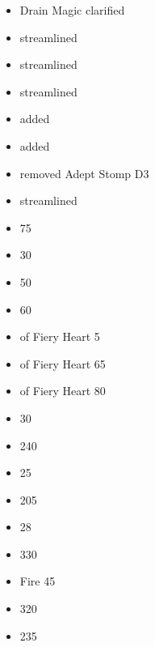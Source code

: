 
\subtitle{{2023 \betaname{} 2}}
\begin{itemize}
	\item Drain Magic clarified
	\item \martialdiscipline{} streamlined
	\item \fleetofficer{} streamlined
	\item \favourofmeladys{} streamlined
	\item \citizenarchers{} added \accurate{}
	\item \initiateofthefieryheart{} added \masterofspellcrafting{} \wordand{} \incendiaryalliance{} 
	\item \initiateofthefieryheart{} removed Adept \wordand{} Stomp D3
	\item \baleighighlanders{} streamlined
	\item \novaflare{} 75 
	\item \starmetalalloy{} 30 
	\item \amethystcrystal{} 50 
	\item \warbannerofryma{} 60 
	\item \honour{} of Fiery Heart \shield{} 5 
	\item \honour{} of Fiery Heart \ha{} 65 
	\item \honour{} of Fiery Heart \dragonforgedarmour{} 80 
	\item \highprince{} \dragonforgedarmour{} 30 
	\item \highprince{} \skysloop{} 240 
	\item \mage{} \gianteagle{} 25 
	\item \lionchariot{} \basecost{} 205
	\item \queensguardSINGULAR{} \extramodel{} 28 
	\item \phoenix{} \basecost{} 330 
	\item \phoenix{} Fire 45 
	\item \initiateofthefieryheart{} \basecost{} 320 
	\item \skysloop{} 235 
\end{itemize}
